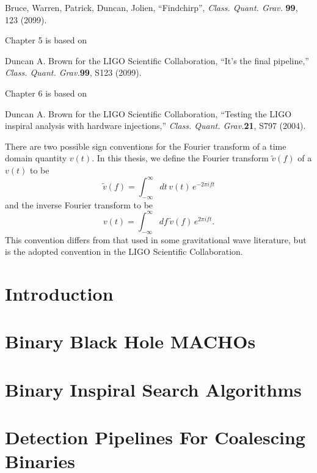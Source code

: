 \documentclass[12pt,notitlepage]{report}
\newcommand{\cqg}{{\it Class. Quant. Grav.}}
\begin{document}
\noindent Bruce, Warren, Patrick, Duncan, Jolien, ``Findchirp'', \cqg {\bf
99}, 123 (2099).

\noindent Chapter 5 is based on

\noindent Duncan A. Brown for the LIGO Scientific Collaboration, ``It's the
final pipeline,'' \cqg {\bf 99}, S123 (2099).

\noindent Chapter 6 is based on 

\noindent Duncan A. Brown for the LIGO Scientific Collaboration, ``Testing the
LIGO inspiral analysis with hardware injections,'' \cqg {\bf 21}, S797 (2004).



\afterpreface
{}
There are two possible sign conventions for the Fourier transform of a time
domain quantity $v(t)$. In this thesis, we define the Fourier transform
$\tilde{v}(f)$ of a $v(t)$ to be
\begin{equation}
\label{eq:ft}
\tilde{v}(f)=\int_{-\infty}^\infty dt\,v(t)\, e^{- 2 \pi i f t}
\end{equation}
and the inverse Fourier transform to be 
\begin{equation}
\label{eq:ift}
v(t)=\int_{-\infty}^\infty df\,\tilde{v}(f)\, e^{2 \pi i f t}.
\end{equation}
This convention differs from that used in some gravitational wave literature,
but is the adopted convention in the LIGO Scientific Collaboration.


\chapter{Introduction}
\label{ch:introduction}
\label{ch:inspiral}

%
\chapter{Binary Black Hole MACHOs}
\label{ch:macho}

\chapter{Binary Inspiral Search Algorithms}
\label{ch:findchirp}

\chapter{Detection Pipelines For Coalescing Binaries}
\label{ch:pipeline}

\end{document}

